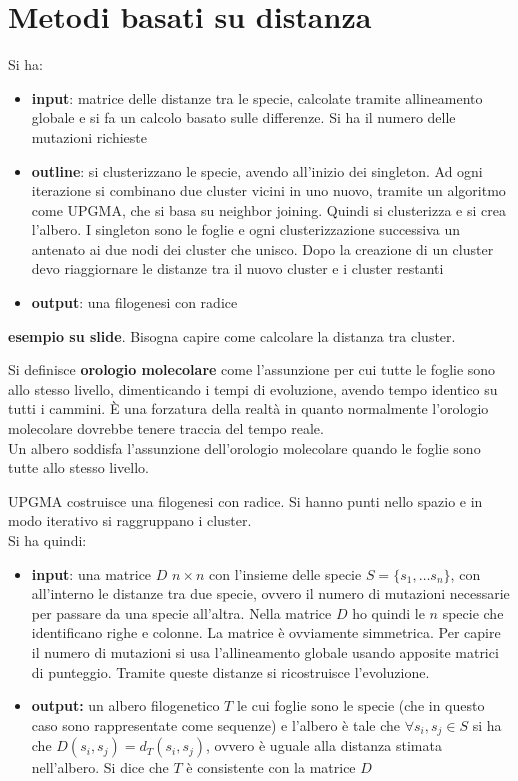 \documentclass[a4paper,12pt, oneside]{book}
\begin{document}
\section{Metodi basati su distanza}
Si ha:
\begin{itemize}
  \item \textbf{input}: matrice delle distanze tra le specie, calcolate tramite
  allineamento globale e si fa un calcolo basato sulle differenze. Si ha il
  numero delle mutazioni richieste
  \item \textbf{outline}: si clusterizzano le specie, avendo all'inizio dei
  singleton. Ad ogni iterazione si combinano due cluster vicini in uno nuovo,
  tramite un algoritmo come UPGMA, che si basa su neighbor joining. Quindi si
  clusterizza e si crea l'albero. I singleton sono le foglie e ogni
  clusterizzazione successiva un antenato ai due nodi dei cluster che
  unisco. Dopo la creazione di un cluster devo riaggiornare le distanze tra il
  nuovo cluster e i cluster restanti
  \item \textbf{output}: una filogenesi con radice
\end{itemize}
\textbf{esempio su slide}.
Bisogna capire come calcolare la distanza tra cluster.
\begin{definizione}
  Si definisce \textbf{orologio molecolare} come l'assunzione per cui tutte le
  foglie sono allo stesso livello, dimenticando i tempi di evoluzione, avendo
  tempo identico su tutti i cammini. È una forzatura della realtà in quanto
  normalmente l'orologio molecolare dovrebbe tenere traccia del tempo reale.\\
  Un albero soddisfa l'assunzione dell'orologio molecolare quando le foglie sono
  tutte allo stesso livello.
\end{definizione}
UPGMA costruisce una filogenesi con radice. Si hanno punti nello spazio e in
modo iterativo si raggruppano i cluster.\\
Si ha quindi:
\begin{itemize}
\item \textbf{input}: una matrice $D$ $n\times n$ con l'insieme delle specie
  $S=\{s_1,\ldots s_n\}$, con all'interno le distanze tra due specie, ovvero
  il numero di mutazioni necessarie per passare da una specie all'altra.
  Nella matrice $D$ ho quindi le $n$ specie che identificano righe e colonne.
  La matrice è ovviamente simmetrica. Per capire il numero di mutazioni si usa
  l'allineamento globale usando apposite matrici di punteggio. Tramite queste
  distanze si ricostruisce l'evoluzione.
\item \textbf{output:} un albero filogenetico $T$ le cui foglie sono le specie
  (che in questo caso sono rappresentate come sequenze) e l'albero è tale che
  $\forall s_i,s_j\in S$ si ha che $D(s_i, s_j)=d_T(s_i,s_j)$, ovvero è uguale
  alla distanza stimata nell'albero. Si dice che $T$ è consistente con la
  matrice $D$
\end{itemize}
\end{document}
